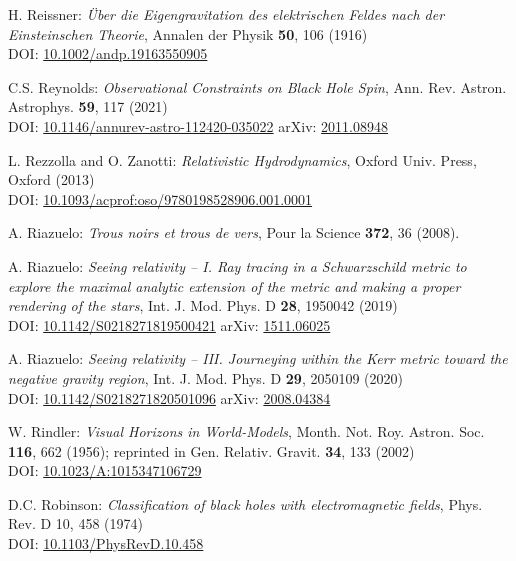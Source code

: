 \begin{thebibliography}{123}
H. Reissner:
{\em Über die Eigengravitation des elektrischen Feldes nach der Einsteinschen Theorie},
Annalen der Physik {\bf 50}, 106 (1916)\\
DOI: \href{https://doi.org/10.1002/andp.19163550905}{10.1002/andp.19163550905}

C.S. Reynolds:
{\em Observational Constraints on Black Hole Spin},
Ann. Rev. Astron. Astrophys. {\bf 59}, 117 (2021)\\
DOI:  \href{https://doi.org/10.1146/annurev-astro-112420-035022}{10.1146/annurev-astro-112420-035022}\hfill
arXiv: \href{https://arxiv.org/abs/2011.08948}{2011.08948}

L. Rezzolla and O. Zanotti:
{\em Relativistic Hydrodynamics},
Oxford Univ. Press, Oxford (2013)\\
DOI: \href{https://doi.org/10.1093/acprof:oso/9780198528906.001.0001}{10.1093/acprof:oso/9780198528906.001.0001}

A. Riazuelo:
{\em Trous noirs et trous de vers},
Pour la Science {\bf 372}, 36 (2008).

A. Riazuelo:
{\em Seeing relativity -- I. Ray tracing in a Schwarzschild metric to explore the maximal analytic extension of the metric and making a proper rendering of the stars},
Int. J. Mod. Phys. D {\bf 28}, 1950042 (2019)\\
DOI: \href{https://doi.org/10.1142/S0218271819500421}{10.1142/S0218271819500421}
\hfill
arXiv: \href{https://arxiv.org/abs/1511.06025}{1511.06025}

A. Riazuelo:
{\em Seeing relativity -- III. Journeying within the Kerr metric toward the negative gravity region},
Int. J. Mod. Phys. D {\bf 29}, 2050109 (2020)\\
DOI: \href{https://doi.org/10.1142/S0218271820501096}{10.1142/S0218271820501096}\hfill
arXiv: \href{https://arxiv.org/abs/2008.04384}{2008.04384}

W. Rindler: {\em Visual Horizons in World-Models},
Month. Not. Roy. Astron. Soc. {\bf 116}, 662 (1956);
reprinted in Gen. Relativ. Gravit. {\bf 34}, 133 (2002)\\
DOI: \href{https://doi.org/10.1023/A:1015347106729}{10.1023/A:1015347106729}

D.C. Robinson:
{\em Classification of black holes with electromagnetic fields},
Phys. Rev. D 10, 458 (1974)\\
DOI: \href{https://doi.org/10.1103/PhysRevD.10.458}{10.1103/PhysRevD.10.458}


\end{thebibliography}
